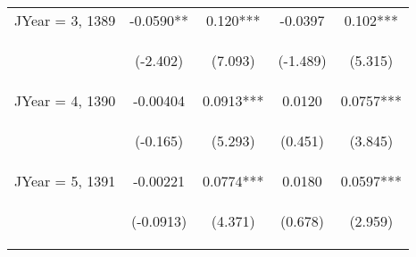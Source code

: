 \documentclass[]{article}
\begin{document}
\begin{center}
\begin{tabular}{lcccc}
        JYear = 3, 1389  & -0.0590**                                       & 0.120***                                       & -0.0397                                        & 0.102***                                       \\
        \vspace{4pt}     & \begin{footnotesize}(-2.402)\end{footnotesize}  & \begin{footnotesize}(7.093)\end{footnotesize}  & \begin{footnotesize}(-1.489)\end{footnotesize} & \begin{footnotesize}(5.315)\end{footnotesize}  \\
        JYear = 4, 1390  & -0.00404                                        & 0.0913***                                      & 0.0120                                         & 0.0757***                                      \\
        \vspace{4pt}     & \begin{footnotesize}(-0.165)\end{footnotesize}  & \begin{footnotesize}(5.293)\end{footnotesize}  & \begin{footnotesize}(0.451)\end{footnotesize}  & \begin{footnotesize}(3.845)\end{footnotesize}  \\
        JYear = 5, 1391  & -0.00221                                        & 0.0774***                                      & 0.0180                                         & 0.0597***                                      \\
        \vspace{4pt}     & \begin{footnotesize}(-0.0913)\end{footnotesize} & \begin{footnotesize}(4.371)\end{footnotesize}  & \begin{footnotesize}(0.678)\end{footnotesize}  & \begin{footnotesize}(2.959)\end{footnotesize}  \\

\end{tabular}
\end{center}
\end{document}
